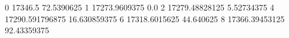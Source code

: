 0 17346.5 72.5390625
1 17273.9609375 0.0
2 17279.48828125 5.52734375
4 17290.591796875 16.630859375
6 17318.6015625 44.640625
8 17366.39453125 92.43359375
